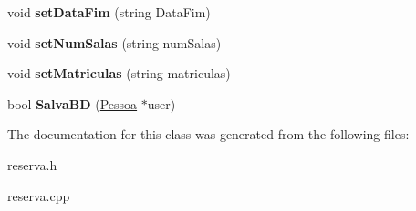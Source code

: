 \begin{DoxyCompactItemize}
\item 
void {\bfseries set\+Data\+Fim} (string Data\+Fim)\hypertarget{classReserva_ac058acb394b17087521c8a8bffee6229}{}\label{classReserva_ac058acb394b17087521c8a8bffee6229}

\item 
void {\bfseries set\+Num\+Salas} (string num\+Salas)\hypertarget{classReserva_ab8262ae6e13995529f0cfe2457fcdb74}{}\label{classReserva_ab8262ae6e13995529f0cfe2457fcdb74}

\item 
void {\bfseries set\+Matriculas} (string matriculas)\hypertarget{classReserva_aac662193ad3a9a846f5c0a2d787377d4}{}\label{classReserva_aac662193ad3a9a846f5c0a2d787377d4}

\item 
bool {\bfseries Salva\+BD} (\hyperlink{classPessoa}{Pessoa} $\ast$user)\hypertarget{classReserva_ae75ef93c1a58a17b092a954216fa0474}{}\label{classReserva_ae75ef93c1a58a17b092a954216fa0474}

\end{DoxyCompactItemize}


The documentation for this class was generated from the following files\+:\begin{DoxyCompactItemize}
\item 
reserva.\+h\item 
reserva.\+cpp\end{DoxyCompactItemize}
